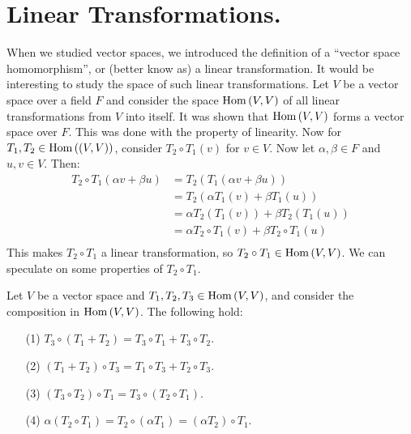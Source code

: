 
\section{Linear Transformations.}

When we studied vector spaces, we introduced the definition of a ``vector space
homomorphism'', or (better know as) a linear transformation. It would be
interesting to study the space of such linear transformations. Let $V$ be a
vector space over a field  $F$ and consider the space $\operatorname{Hom}{(V,V)}$ of all linear
transformations from $V$ into itself. It was shown that $\operatorname{Hom}{(V,V)}$ forms a
vector space over $F$. This was done with the property of linearity. Now for
$T_1,T_2 \in \operatorname{Hom}{((V,V))}$, consider $T_2 \circ T_1(v)$ for $v \in V$. Now let
$\alpha, \beta \in F$ and  $u, v \in V$. Then:
    \begin{align*}
        T_2 \circ T_1(\alpha v+\beta u) &= T_2(T_1(\alpha v+\beta u)) \\
                           &= T_2(\alpha T_1(v)+\beta T_1(u)) \\
                           & = \alpha T_2(T_1(v))+\beta T_2(T_1(u)) \\
                           &= \alpha T_2 \circ T_1(v)+\beta T_2 \circ T_1(u) \\
    \end{align*}
This makes $T_2 \circ T_1$ a linear transformation, so $T_2 \circ T_1 \in
\operatorname{Hom}{(V,V)}$. We can speculate on some properties of $T_2 \circ T_1$.

\begin{lemma}\label{3.1.1}
    Let $V$ be a vector space and  $T_1, T_2, T_3 \in \operatorname{Hom}{(V,V)}$, and consider 
    the composition in $\operatorname{Hom}{(V,V)}$. The following hold:
        \begin{enumerate}
            \item[(1)] $T_3 \circ (T_1+T_2)=T_3 \circ T_1+T_3 \circ T_2$.

            \item[(2)] $(T_1+T_2) \circ T_3=T_1 \circ T_3+T_2 \circ T_3$.

            \item[(3)] $(T_3 \circ T_2) \circ T_1=T_3 \circ (T_2 \circ T_1)$.

            \item[(4)] $\alpha(T_2 \circ T_1)=T_2 \circ (\alpha T_1)= 
                (\alpha T_2) \circ T_1$.
        \end{enumerate}
\end{lemma}

